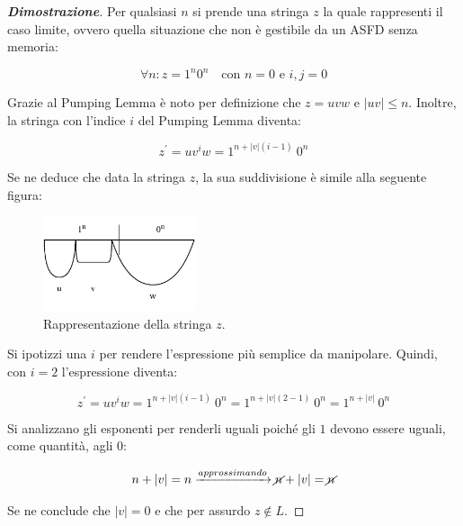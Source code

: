 \documentclass[a4paper]{article}
\begin{document}
	\begin{proof}[\textcolor{Blue3}{\textbf{Dimostrazione}}]
		Per qualsiasi $n$ si prende una stringa $z$ la quale rappresenti il caso limite, ovvero quella situazione che non è gestibile da un ASFD senza memoria:
		
		\begin{equation*}
			\forall n : z = 1^{n} 0^{n} \hspace{1em} \text{con } n = 0 \text{ e } i,j = 0	
		\end{equation*}
	
		\noindent
		Grazie al Pumping Lemma è noto per definizione che $z = uvw$ e $|uv| \le n$. Inoltre, la stringa con l'indice $i$ del Pumping Lemma diventa:
		
		\begin{equation*}
			z^{'} = u v^{i} w = 1^{n + |v|\left(i - 1\right)} \: 0^{n}
		\end{equation*}
		
		\noindent
		Se ne deduce che data la stringa $z$, la sua suddivisione è simile alla seguente figura:
		
		\begin{figure}[!htp]
			\centering
			\includegraphics[width=0.4\textwidth]{img/lemma_pumping_ex1.pdf}
			\caption{Rappresentazione della stringa $z$.}
		\end{figure}
		
		\noindent
		Si ipotizzi una $i$ per rendere l'espressione più semplice da manipolare. Quindi, con $i = 2$ l'espressione diventa:
		
		\begin{equation*}
			z^{'} = u v^{i} w = 1^{n + |v|\left(i - 1\right)} \: 0^{n} =1^{n + |v|\left(2 - 1\right)} \: 0^{n} = 1^{n + |v|} \: 0^{n}
		\end{equation*}
	
		\noindent
		Si analizzano gli esponenti per renderli uguali poiché gli $1$ devono essere uguali, come quantità, agli $0$:
		
		\begin{equation*}
			n + |v| = n \xrightarrow{approssimando} \cancel{n} + |v| = \cancel{n}
		\end{equation*}
	
		\noindent
		Se ne conclude che $|v| = 0$ e che per assurdo $z \notin L$.
	\end{proof}
\end{document}
